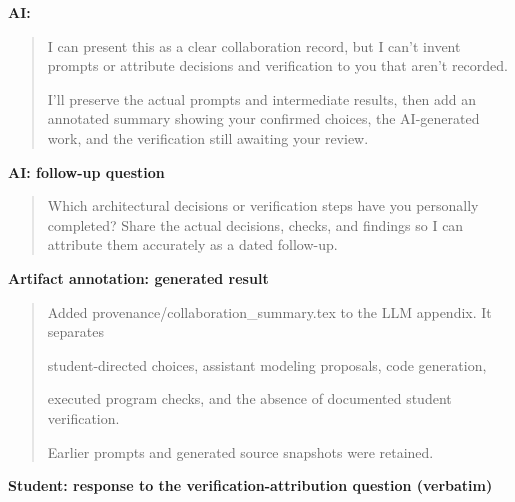 \par\medskip\noindent\textbf{AI:}\par

\begin{quote}\small\raggedright

I can present this as a clear collaboration record, but I can't invent prompts or attribute decisions and verification to you that aren't recorded.\par
I'll preserve the actual prompts and intermediate results, then add an annotated summary showing your confirmed choices, the AI-generated work, and the verification still awaiting your review.\par

\end{quote}

\par\medskip\noindent\textbf{AI: follow-up question}\par

\begin{quote}\small\raggedright

Which architectural decisions or verification steps have you personally completed? Share the actual decisions, checks, and findings so I can attribute them accurately as a dated follow-up.\par

\end{quote}

\par\medskip\noindent\textbf{Artifact annotation: generated result}\par

\begin{quote}\small\raggedright

Added provenance/collaboration\_summary.tex to the LLM appendix. It separates\par
student-directed choices, assistant modeling proposals, code generation,\par
executed program checks, and the absence of documented student verification.\par
Earlier prompts and generated source snapshots were retained.\par

\end{quote}

\par\medskip\noindent\textbf{Student: response to the verification-attribution question (verbatim)}\par

